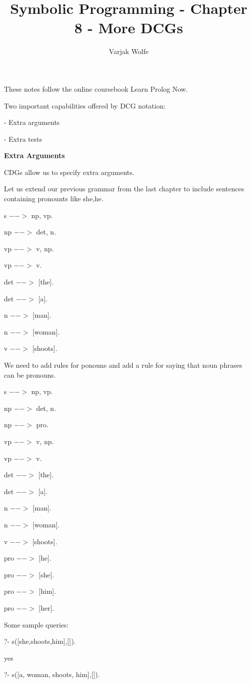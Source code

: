 \documentclass{article}
\title{Symbolic Programming -  Chapter 8 - More DCGs}
\author{Varjak Wolfe}
\begin{document}
\maketitle

These notes follow the online coursebook Learn Prolog Now.

Two important capabilities offered by DCG notation:

- Extra arguments

- Extra tests


\textbf{Extra Arguments}

CDGs allow us to specify extra arguments.

Let us extend our previous grammar from the last chapter to include sentences containing pronounts like she,he.

s $-->$ np, vp. 

np $-->$ det, n. 

vp $-->$ v, np. 

vp $-->$ v. 

det $-->$ [the].     
       
det $-->$ [a]. 

n $-->$ [man].    
           
n $-->$ [woman].   
        
v $-->$ [shoots].

We need to add rules for ponouns and add a rule for saying that noun phrases can be pronouns.

s $-->$ np, vp. 

np $-->$ det, n. 

np $-->$ pro.

vp $-->$ v, np. 

vp $-->$ v. 

det $-->$ [the].     
       
det $-->$ [a]. 

n $-->$ [man].    
           
n $-->$ [woman].   
        
v $-->$ [shoots].

pro $-->$ [he].

pro $-->$  [she].

pro $-->$ [him].

pro $-->$ [her].


Some sample queries:

?- s([she,shoots,him],[]).

yes


?- s([a, woman, shoots, him],[]).
\end{document}
